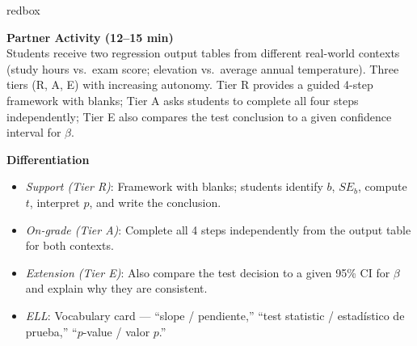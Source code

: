 \documentclass[10pt]{article}
\begin{document}
\begin{skillbox}{redbox}
\begin{minipage}[t]{0.48\linewidth}
    \textbf{Partner Activity (12--15 min)}\\
    Students receive two regression output tables from different real-world contexts
    (study hours vs.\ exam score; elevation vs.\ average annual temperature). Three
    tiers (R, A, E) with increasing autonomy. Tier R provides a guided 4-step
    framework with blanks; Tier A asks students to complete all four steps
    independently; Tier E also compares the test conclusion to a given confidence
    interval for $\beta$.
\end{minipage}
\hfill
\begin{minipage}[t]{0.48\linewidth}
    \textbf{Differentiation}
    \begin{itemize}
        \item \textit{Support (Tier R)}: Framework with blanks; students identify
              $b$, $SE_b$, compute $t$, interpret $p$, and write the conclusion.
        \item \textit{On-grade (Tier A)}: Complete all 4 steps independently from
              the output table for both contexts.
        \item \textit{Extension (Tier E)}: Also compare the test decision to a given
              95\% CI for $\beta$ and explain why they are consistent.
        \item \textit{ELL}: Vocabulary card --- ``slope / pendiente,''
              ``test statistic / estadístico de prueba,'' ``$p$-value / valor $p$.''
    \end{itemize}
\end{minipage}
\end{skillbox}
\end{document}
